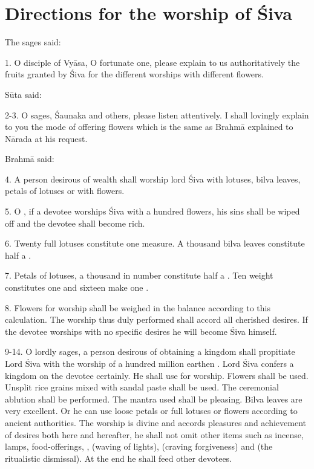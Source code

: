 \chapter{Directions for the worship of Śiva}

The sages said:

1. O disciple of Vyāsa, O fortunate one, please explain to us authoritatively
the fruits granted by Śiva for the different worships with different flowers.

Sūta said:

2-3. O sages, Śaunaka and others, please listen attentively. I shall lovingly
explain to you the mode of offering flowers which is the same as Brahmā
explained to Nārada at his request.

Brahmā said:

4. A person desirous of wealth shall worship lord Śiva with lotuses, bilva
leaves, petals of lotuses or with  flowers.

5. O , if a devotee worships Śiva with a hundred flowers, his sins
shall be wiped off and the devotee shall become rich.

6. Twenty full lotuses constitute one  measure. A thousand bilva
leaves constitute half a .

7. Petals of lotuses, a thousand in number constitute half a . Ten
 weight constitutes one  and sixteen  make one
.

8. Flowers for worship shall be weighed in the balance according to this
calculation. The worship thus duly performed shall accord all cherished desires.
If the devotee worships with no specific desires he will become Śiva himself.

9-14. O lordly sages, a person desirous of obtaining a kingdom shall propitiate
Lord Śiva with the worship of a hundred million earthen . Lord Śiva
confers a kingdom on the devotee certainly. He shall use  for
worship. Flowers shall be used. Unsplit rice grains mixed with sandal paste
shall be used. The ceremonial ablution shall be performed. The mantra used shall
be pleasing. Bilva leaves are very excellent. Or he can use loose petals or full
lotuses or  flowers according to ancient authorities. The worship is
divine and accords pleasures and achievement of desires both here and hereafter,
he shall not omit other items such as incense, lamps, food-offerings, ,
 (waving of lights),  (craving
forgiveness) and  (the ritualistic dismissal). At the end he shall
feed other devotees.


